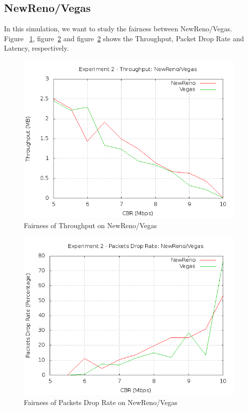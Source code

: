\documentclass[10pt, conference]{lib/IEEEtran}
\begin{document}
\subsection{NewReno/Vegas}
In this simulation, we want to study the fairness between NewReno/Vegas.
Figure ~\ref{fig:exp2_thp_nv}, figure~\ref{fig:exp2_dr_nv} and 
figure~\ref{fig:exp2_dr_nv} shows the Throughput, Packet Drop Rate and 
Latency, respectively.
\begin{figure}[H]
    \centering
    \includegraphics[width=1.0\linewidth]{plot/exp2-thp-NewReno-Vegas.png}
    \caption{Fairness of Throughput on NewReno/Vegas}
    \label{fig:exp2_thp_nv}
\end{figure}
\begin{figure}[H]
    \centering
    \includegraphics[width=1.0\linewidth]{plot/exp2-dr-NewReno-Vegas.png}
    \caption{Fairness of Packets Drop Rate on NewReno/Vegas}
    \label{fig:exp2_dr_nv}
\end{figure}
\end{document}
